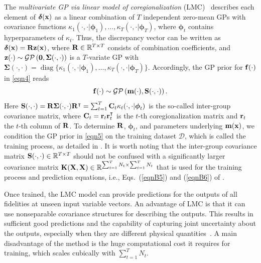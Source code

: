 \documentclass[journal ]{new-aiaa}
\DeclareMathOperator{\diag}{diag}
\begin{document}
The \textit{multivariate GP via linear model of coregionalization} (LMC)~\citep[see e.g.,][]{Chiles1999,Fricker2013} describes each element of ${\boldsymbol \delta}({\bf x})$ as a linear combination of $T$ independent zero-mean GPs with covariance functions $\kappa_1(\cdot,\cdot|{\boldsymbol \phi}_1),\dots,\kappa_T(\cdot,\cdot|{\boldsymbol \phi}_T)$, where ${\boldsymbol \phi}_t$ contains hyperparameters of $\kappa_t$.
Thus, the discrepancy vector can be written as ${\boldsymbol \delta}({\bf x}) = {\bf R} {\bf z}({\bf x})$, where ${\bf R} \in \mathbb{R}^{T \times T}$ consists of combination coefficients, and ${\bf z}(\cdot) \sim \mathcal{GP}\left({\bf 0},{\boldsymbol \Sigma}(\cdot,\cdot)\right)$ is a $T$-variate GP with ${\boldsymbol \Sigma}(\cdot,\cdot) = \diag\{\kappa_1(\cdot,\cdot|{\boldsymbol \phi}_1),\dots,\kappa_T(\cdot,\cdot|{\boldsymbol \phi}_T)\}$.
Accordingly, the GP prior for ${\bf f}(\cdot)$ in \cref{eqn4} reads
\begin{equation}\label{eqn5}
	{\bf f}(\cdot) \sim \mathcal{GP}\left({\bf m}(\cdot),{\bf S}(\cdot,\cdot)\right).
\end{equation}
Here 
${\bf S}(\cdot,\cdot) = {\bf R} {\boldsymbol \Sigma}(\cdot,\cdot) {\bf R}^\intercal = \sum_{t=1}^T {\bf C}_t \kappa_t(\cdot,\cdot|{\boldsymbol \phi}_t)$ is the so-called inter-group covariance matrix, where ${\bf C}_t = {\bf r}_t {\bf r}_t^\intercal$ is the $t$-th coregionalization matrix and ${\bf r}_t$ the $t$-th column of ${\bf R}$.
To determine ${\bf R}$, ${\boldsymbol \phi}_t$, and parameters underlying ${\bf m}({\bf x})$, we condition the GP prior in \cref{eqn5} on the training dataset $\mathcal{D}$, which is called the training process, as detailed in . 
It is worth noting that the inter-group covariance matrix ${\bf S}(\cdot,\cdot) \in \mathbb{R}^{T \times T}$ should not be confused with a significantly larger covariance matrix ${\bf K}({\bf X},{\bf X}) \in \mathbb{R}^{\sum_{t=1}^{T}N_t \times \sum_{t=1}^{T}N_t}$ that is used for the training process and prediction equations, i.e., Eqs.~(\ref{eqnB5}) and (\ref{eqnB6}) of .

Once trained, the LMC model can provide predictions for the outputs of all fidelities at unseen input variable vectors.
An advantage of LMC is that it can use nonseparable covariance structures for describing the outputs.
This results in sufficient good predictions and the capability of capturing joint uncertainty about the outputs, especially when they are different physical quantities~\citep{Fricker2013}.
A main disadvantage of the method is the huge computational cost it requires for training, which scales cubically with $\sum_{t=1}^{T}N_t$.
\end{document}
